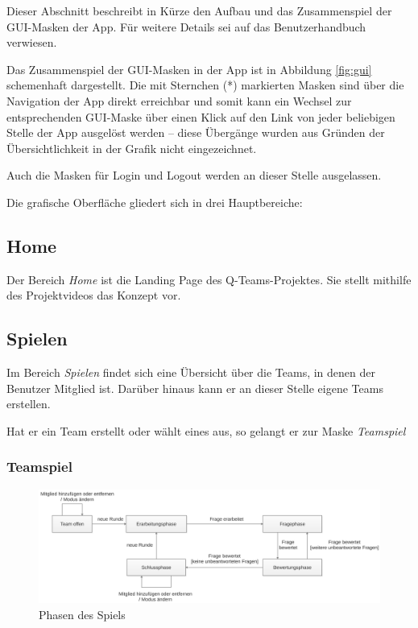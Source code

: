 \documentclass[a4paper,11pt,listof=numbered,glossary=totoc,parskip=half,toc=bib]{scrreprt}
\begin{document}
	Dieser Abschnitt beschreibt in Kürze den Aufbau und das Zusammenspiel der GUI-Masken der App. Für weitere Details sei auf das Benutzerhandbuch verwiesen.
	
	Das Zusammenspiel der GUI-Masken in der App ist in Abbildung \ref{fig:gui} schemenhaft dargestellt. Die mit Sternchen (*) markierten Masken sind über die Navigation der App direkt erreichbar und somit kann ein Wechsel zur entsprechenden GUI-Maske über einen Klick auf den Link von jeder beliebigen Stelle der App ausgelöst werden -- diese Übergänge wurden aus Gründen der Übersichtlichkeit in der Grafik nicht eingezeichnet.
	
	Auch die Masken für Login und Logout werden an dieser Stelle ausgelassen.
	
	Die grafische Oberfläche gliedert sich in drei Hauptbereiche:
		
	\subsection{Home}
	Der Bereich \textit{Home} ist die Landing Page des Q-Teams-Projektes. Sie stellt mithilfe des Projektvideos das Konzept vor.

	\subsection{Spielen}
	Im Bereich \textit{Spielen} findet sich eine Übersicht über die Teams, in denen der Benutzer Mitglied ist. Darüber hinaus kann er an dieser Stelle eigene Teams erstellen.
	
	Hat er ein Team erstellt oder wählt eines aus, so gelangt er zur Maske \textit{Teamspiel}
	
	\subsubsection{Teamspiel}	

	\begin{figure}
		\centering
		\includegraphics[width=\textwidth]{ablauf}
		\caption{Phasen des Spiels}
		\label{fig:phasen}
	\end{figure}
		
\end{document}
